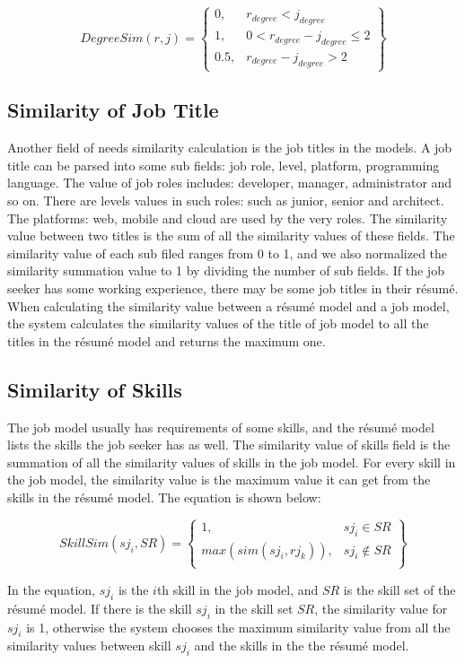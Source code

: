 $$ DegreeSim(r,j ) = \begin{Bmatrix}
0,   & r_{degree} < j_{degree} \\
1,   & 0 < r_{degree} - j_{degree} \leqslant 2  \\
0.5, & r_{degree} - j_{degree} > 2
\end{Bmatrix} $$

\subsection{Similarity of Job Title}
Another field of needs similarity calculation is the job titles in the models. A job title can be parsed into some sub fields: job role, level, platform, programming language.  The value of job roles includes: developer, manager, administrator and so on. There are levels values in such roles: such as junior, senior and architect. The platforms: web, mobile and cloud are used by the very roles.  The similarity value between two titles is the sum of all the similarity values of these fields. The similarity value of each sub filed ranges from 0 to 1, and we also normalized the similarity summation value to 1 by dividing the number of sub fields. If the job seeker has some working experience, there may be some job titles in their r\'esum\'e.  When calculating the similarity value between a r\'esum\'e model and a job model, the system calculates the similarity values of the title of job model to all the titles in the r\'esum\'e model and returns the maximum one.

\subsection{Similarity of Skills}

The job model usually has requirements of some skills, and the r\'esum\'e model lists the skills the job seeker has as well. The similarity value of skills field is the summation of all the similarity values of skills in the job model. For every skill in the job model, the similarity value is the maximum value it can get from the skills in the r\'esum\'e model. The equation is shown below:

$$ SkillSim(sj_i,SR ) = \begin{Bmatrix}
1, & sj_i \in SR  \\
max( sim (sj_i, rj_k )), & sj_i \notin SR \\
\end{Bmatrix} $$

In the equation, $sj_i$ is the $i$th skill in the job model, and $SR$ is the skill set of the r\'esum\'e model. If there is the skill $sj_i$ in the skill set $SR$, the similarity value for $sj_i$ is 1, otherwise the system chooses the maximum similarity value from all the similarity values between skill $sj_i$ and the skills in the the r\'esum\'e model.
